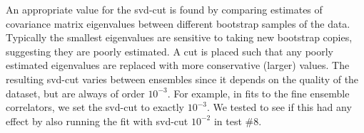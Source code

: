 An appropriate value for the svd-cut is found by comparing estimates of covariance matrix eigenvalues between different bootstrap samples of the data. Typically the smallest eigenvalues are sensitive to taking new bootstrap copies, suggesting they are poorly estimated. A cut is placed such that any poorly estimated eigenvalues are replaced with more conservative (larger) values. The resulting svd-cut varies between ensembles since it depends on the quality of the dataset, but are always of order $10^{-3}$.
For example, in fits to the fine ensemble correlators, we set the svd-cut to exactly $10^{-3}$. We tested to see if this had any effect by also running the fit with svd-cut $10^{-2}$ in test \#8.


